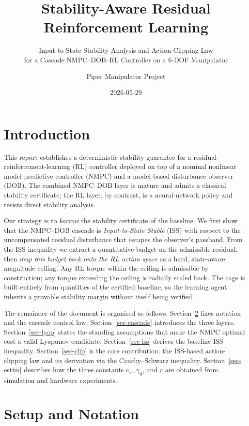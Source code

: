 \documentclass[
  11pt,
]{article}
\title{Stability-Aware Residual Reinforcement Learning}
\subtitle{Input-to-State Stability Analysis and Action-Clipping Law\\
for a Cascade NMPC--DOB--RL Controller on a 6-DOF Manipulator}
\author{Piper Manipulator Project}
\date{2026-05-29}
\renewcommand*\contentsname{Table of contents}
\newcommand\contentsname{Table of contents}
\theoremstyle{plain}
\theoremstyle{plain}
\theoremstyle{definition}
\theoremstyle{remark}
\begin{document}
\maketitle

\renewcommand*\contentsname{Table of contents}
{
\setcounter{tocdepth}{3}
\tableofcontents
}

\section{Introduction}\label{sec-intro}

This report establishes a deterministic stability guarantee for a
residual reinforcement-learning (RL) controller deployed on top of a
nominal nonlinear model-predictive controller (NMPC) and a model-based
disturbance observer (DOB). The combined NMPC--DOB layer is mature and
admits a classical stability certificate; the RL layer, by contrast, is
a neural-network policy and resists direct stability analysis.

Our strategy is to \emph{borrow} the stability certificate of the
baseline. We first show that the NMPC--DOB cascade is
\emph{Input-to-State Stable} (ISS) with respect to the uncompensated
residual disturbance that escapes the observer's passband. From the ISS
inequality we extract a quantitative budget on the admissible residual,
then \emph{map this budget back onto the RL action space} as a hard,
state-aware magnitude ceiling. Any RL torque within the ceiling is
admissible by construction; any torque exceeding the ceiling is radially
scaled back. The cage is built entirely from quantities of the certified
baseline, so the learning agent inherits a provable stability margin
without itself being verified.

The remainder of the document is organised as follows.
Section~\ref{sec-setup} fixes notation and the cascade control law.
Section~\ref{sec-cascade} introduces the three layers.
Section~\ref{sec-lyap} states the standing assumptions that make the
NMPC optimal cost a valid Lyapunov candidate. Section~\ref{sec-iss}
derives the baseline ISS inequality. Section~\ref{sec-clip} is the core
contribution: the ISS-based action-clipping law and its derivation via
the Cauchy--Schwarz inequality. Section~\ref{sec-estim} describes how
the three constants \(c_x\), \(\gamma_0\), and \(r\) are obtained from
simulation and hardware experiments.

\section{Setup and Notation}\label{sec-setup}
\end{document}
